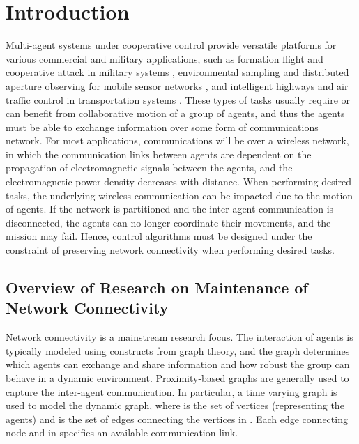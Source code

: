 \documentclass[english]{IOS-Book-Article}
\theoremstyle{definition}
\theoremstyle{definition}
\begin{document}
\section{Introduction}

Multi-agent systems under cooperative control provide versatile platforms
for various commercial and military applications, such as formation
flight and cooperative attack in military systems \cite{Beard2006},
environmental sampling and distributed aperture observing for mobile
sensor networks \cite{zhang2010cooperative}, and intelligent highways
and air traffic control in transportation systems \cite{Tomlin1998a}.
These types of tasks usually require or can benefit from collaborative
motion of a group of agents, and thus the agents must be able to exchange
information over some form of communications network. For most applications,
communications will be over a wireless network, in which the communication
links between agents are dependent on the propagation of electromagnetic
signals between the agents, and the electromagnetic power density
decreases with distance. When performing desired tasks, the underlying
wireless communication can be impacted due to the motion of agents.
If the network is partitioned and the inter-agent communication is
disconnected, the agents can no longer coordinate their movements,
and the mission may fail. Hence, control algorithms must be designed
under the constraint of preserving network connectivity when performing
desired tasks. 


\subsection{Overview of Research on Maintenance of Network Connectivity}

Network connectivity is a mainstream research focus. The interaction
of agents is typically modeled using constructs from graph theory,
and the graph determines which agents can exchange and share information
and how robust the group can behave in a dynamic environment. Proximity-based
graphs are generally used to capture the inter-agent communication.
In particular, a time varying graph  is
used to model the dynamic graph, where  is the set of
vertices (representing the agents) and  is the set
of edges connecting the vertices in . Each edge connecting
node  and  in  specifies an available communication
link. 
\end{document}
